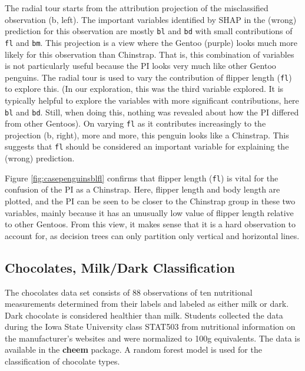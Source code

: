 \documentclass[
]{jss}
\begin{document}
The radial tour starts from the attribution projection of the misclassified observation (b, left). The important variables identified by SHAP in the (wrong) prediction for this observation are mostly \texttt{bl} and \texttt{bd} with small contributions of \texttt{fl} and \texttt{bm}. This projection is a view where the Gentoo (purple) looks much more likely for this observation than Chinstrap. That is, this combination of variables is not particularly useful because the PI looks very much like other Gentoo penguins. The radial tour is used to vary the contribution of flipper length (\texttt{fl}) to explore this. (In our exploration, this was the third variable explored. It is typically helpful to explore the variables with more significant contributions, here \texttt{bl} and \texttt{bd}. Still, when doing this, nothing was revealed about how the PI differed from other Gentoos). On varying \texttt{fl} as it contributes increasingly to the projection (b, right), more and more, this penguin looks like a Chinstrap. This suggests that \texttt{fl} should be considered an important variable for explaining the (wrong) prediction.

Figure \ref{fig:casepenguinsblfl} confirms that flipper length (\texttt{fl}) is vital for the confusion of the PI as a Chinstrap. Here, flipper length and body length are plotted, and the PI can be seen to be closer to the Chinstrap group in these two variables, mainly because it has an unusually low value of flipper length relative to other Gentoos. From this view, it makes sense that it is a hard observation to account for, as decision trees can only partition only vertical and horizontal lines.

\hypertarget{chocolates-milkdark-classification}{%
\subsection{Chocolates, Milk/Dark Classification}\label{chocolates-milkdark-classification}}

The chocolates data set consists of 88 observations of ten nutritional measurements determined from their labels and labeled as either milk or dark. Dark chocolate is considered healthier than milk. Students collected the data during the Iowa State University class STAT503 from nutritional information on the manufacturer's websites and were normalized to 100g equivalents. The data is available in the \textbf{cheem} package. A random forest model is used for the classification of chocolate types.
\end{document}
